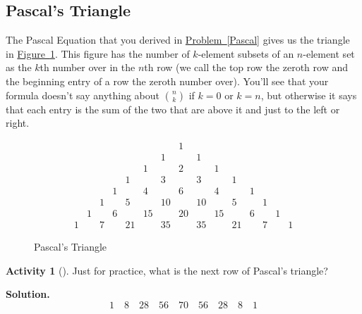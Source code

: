\documentclass[10pt,]{book}
\theoremstyle{plain}
\theoremstyle{definition}
\newtheorem{activity}[project]{Activity}
\numberwithin{equation}{chapter}
\newcommand{\amp}{&}
\begin{document}
\subsection[{Pascal's Triangle}]{Pascal's Triangle}\label{subsection-5}
The Pascal Equation that you derived in \hyperref[Pascal]{Problem~\ref{Pascal}} gives us the triangle in \hyperref[Pascaltriangle]{Figure~\ref{Pascaltriangle}}. This figure has the number of \(k\)-element subsets of an \(n\)-element set as the \(k\)th number over in the \(n\)th row (we call the top row the zeroth row and the beginning entry of a row the zeroth number over). You'll see that your formula doesn't say anything about \(\binom{n}{k}\) if \(k=0\) or \(k=n\), but otherwise it says that each entry is the sum of the two that are above it and just to the left or right.%
\begin{figure}
\centering
{}%
\begin{equation*}
\begin{matrix}\amp \amp \amp \amp \amp \amp \amp 1\amp \amp \amp \amp \amp \amp \amp \\
\amp \amp \amp \amp \amp \amp 1\amp \amp 1\amp \amp \amp \amp \amp \amp \\
\amp \amp \amp \amp \amp 1\amp \amp 2\amp \amp 1\amp \amp \amp \amp \amp \\
\amp \amp \amp \amp 1\amp \amp 3\amp \amp 3\amp \amp 1\amp \amp \amp \amp \\
\amp \amp \amp 1\amp \amp 4\amp \amp 6\amp \amp 4\amp \amp 1\amp \amp \\
\amp \amp 1\amp \amp 5\amp \amp 10\amp \amp 10\amp \amp 5\amp \amp 1\amp \\
\amp 1\amp \amp 6\amp \amp 15\amp \amp 20\amp \amp 15\amp \amp 6\amp \amp 1\\
1\amp \amp 7\amp \amp 21\amp \amp 35\amp \amp 35\amp \amp 21\amp \amp 7\amp \amp 1
\end{matrix}
\end{equation*}
%
\caption{Pascal's Triangle\label{Pascaltriangle}}
\end{figure}
\begin{activity}[]\label{activity-30}
Just for practice, what is the next row of Pascal's triangle?%
\par\medskip\noindent%
\textbf{Solution.}\quad %
\begin{equation*}
1 \quad 8 \quad 28 \quad 56 \quad 70 \quad 56 \quad 28 \quad 8 \quad 1
\end{equation*}
%
\end{activity}
\end{document}
